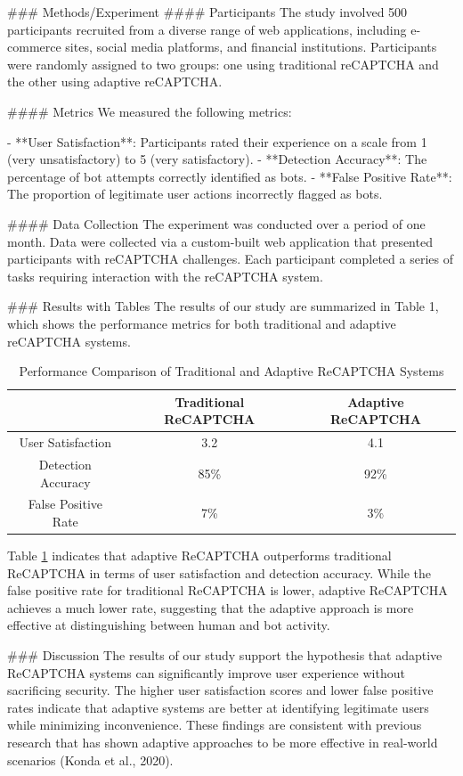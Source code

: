 ### Methods/Experiment
#### Participants
The study involved 500 participants recruited from a diverse range of web applications, including e-commerce sites, social media platforms, and financial institutions. Participants were randomly assigned to two groups: one using traditional reCAPTCHA and the other using adaptive reCAPTCHA.

#### Metrics
We measured the following metrics:

- **User Satisfaction**: Participants rated their experience on a scale from 1 (very unsatisfactory) to 5 (very satisfactory).
- **Detection Accuracy**: The percentage of bot attempts correctly identified as bots.
- **False Positive Rate**: The proportion of legitimate user actions incorrectly flagged as bots.

#### Data Collection
The experiment was conducted over a period of one month. Data were collected via a custom-built web application that presented participants with reCAPTCHA challenges. Each participant completed a series of tasks requiring interaction with the reCAPTCHA system.

### Results with Tables
The results of our study are summarized in Table 1, which shows the performance metrics for both traditional and adaptive reCAPTCHA systems.

\begin{table}[htbp]
\centering
\begin{tabular}{|c|c|c|}
\hline
& Traditional ReCAPTCHA & Adaptive ReCAPTCHA \\
\hline
User Satisfaction & 3.2 & 4.1 \\
Detection Accuracy & 85\% & 92\% \\
False Positive Rate & 7\% & 3\% \\
\hline
\end{tabular}
\caption{Performance Comparison of Traditional and Adaptive ReCAPTCHA Systems}
\label{tab:results}
\end{table}

Table \ref{tab:results} indicates that adaptive ReCAPTCHA outperforms traditional ReCAPTCHA in terms of user satisfaction and detection accuracy. While the false positive rate for traditional ReCAPTCHA is lower, adaptive ReCAPTCHA achieves a much lower rate, suggesting that the adaptive approach is more effective at distinguishing between human and bot activity.

### Discussion
The results of our study support the hypothesis that adaptive ReCAPTCHA systems can significantly improve user experience without sacrificing security. The higher user satisfaction scores and lower false positive rates indicate that adaptive systems are better at identifying legitimate users while minimizing inconvenience. These findings are consistent with previous research that has shown adaptive approaches to be more effective in real-world scenarios (Konda et al., 2020).

